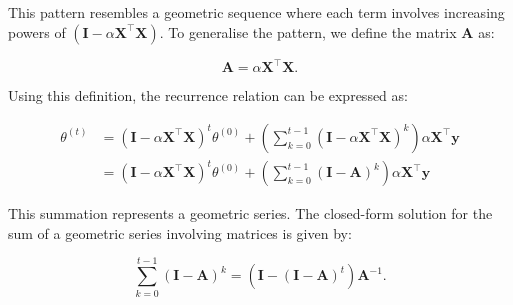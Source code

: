 This pattern resembles a geometric sequence where each term involves increasing powers of \((\mathbf{I} - \alpha \boldsymbol{X}^\top \boldsymbol{X})\). To generalise the pattern, we define the matrix \(\mathbf{A}\) as:

\[
    \mathbf{A} = \alpha \boldsymbol{X}^\top \boldsymbol{X}.
\]

Using this definition, the recurrence relation can be expressed as:

\begin{align*}
    \theta^{(t)} & = (\mathbf{I} - \alpha \boldsymbol{X}^\top \boldsymbol{X})^t \theta^{(0)}  + \left( \sum_{k=0}^{t-1} (\boldsymbol{I} -  \alpha \boldsymbol{X}^\top \boldsymbol{X})^k\right) \alpha \boldsymbol{X} ^\top \boldsymbol{y} \\
                 & = (\mathbf{I} - \alpha \boldsymbol{X}^\top \boldsymbol{X})^t \theta^{(0)}  + \left( \sum_{k=0}^{t-1} (\boldsymbol{I} -  \mathbf{A})^k \right)  \alpha \boldsymbol{X} ^\top \boldsymbol{y}
\end{align*}



This summation represents a geometric series. The closed-form solution for the sum of a geometric series involving matrices is given by:

\[
    \sum_{k=0}^{t-1} (\bm{I} - \bm{A})^k = (\bm{I} - (\bm{I} - \bm{A})^t)\bm{A}^{-1}.
\]



